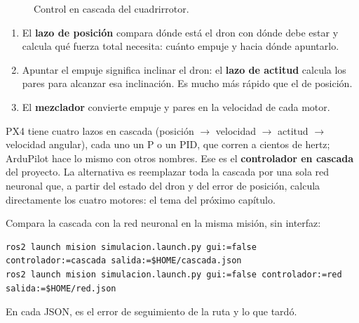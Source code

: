 \begin{figure}[H]
\centering
{}
\caption{Control en cascada del cuadrirrotor.}
\label{fig:cascada}
\end{figure}

\begin{enumerate}
  \item El \textbf{lazo de posición} compara dónde está el dron con dónde debe estar y calcula qué
        fuerza total necesita: cuánto empuje y hacia dónde apuntarlo.
  \item Apuntar el empuje significa inclinar el dron: el \textbf{lazo de actitud} calcula los pares
        para alcanzar esa inclinación. Es mucho más rápido que el de posición.
  \item El \textbf{mezclador} convierte empuje y pares en la velocidad de cada motor.
\end{enumerate}
PX4 tiene cuatro lazos en cascada (posición $\rightarrow$ velocidad $\rightarrow$ actitud
$\rightarrow$ velocidad angular), cada uno un P o un PID, que corren a cientos de hertz; ArduPilot hace lo
mismo con otros nombres. Ese es el \textbf{controlador en cascada} del proyecto. La alternativa es
reemplazar toda la cascada por una sola red neuronal que, a partir del estado del dron y del error de
posición, calcula directamente los cuatro motores: el tema del próximo capítulo.

\begin{ejercicio}
Compara la cascada con la red neuronal en la misma misión, sin interfaz:
\begin{lstlisting}[style=bash]
ros2 launch mision simulacion.launch.py gui:=false controlador:=cascada salida:=$HOME/cascada.json
ros2 launch mision simulacion.launch.py gui:=false controlador:=red salida:=$HOME/red.json
\end{lstlisting}
En cada JSON,  es el error de seguimiento de la ruta y  lo que tardó.
\end{ejercicio}
